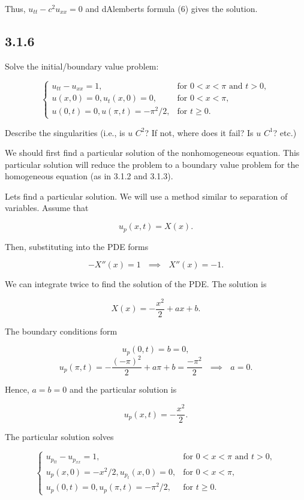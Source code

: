 \documentclass{article}
\begin{document}
Thus, $u_{tt}-c^2u_{xx}=0$ and d\textsc{}Alembert\textsc{}s formula (6) gives the solution.
\subsection{\textbf{3.1.6}} Solve the initial/boundary value problem:

\[
  \begin{cases}
  u_{tt}-u_{xx}=1,  &\text{for $0<x<\pi$ and $t>0$}, \\
  u(x,0)=0, u_t(x,0)=0, & \text{for $0<x<\pi$}, \\
  u(0,t)=0, u(\pi,t)=-\pi^2/2, & \text{for $t\geq0$}.
  \end{cases}
\]

Describe the singularities (i.e., is $u$ $C^2$? If not, where does it fail? Is $u$ $C^1$? etc.)

We should first find a particular solution of the nonhomogeneous equation. This particular solution will reduce the problem to a boundary value problem for the homogeneous equation (as in 3.1.2 and 3.1.3).

Let\textsc{}s find a particular solution. We will use a method similar to separation of variables. Assume that

$$u_p(x,t)=X(x).$$

Then, substituting into the PDE forms

$$-X''(x)=1 ~~~\implies~~~ X''(x)=-1.$$

We can integrate twice to find the solution of the PDE. The solution is

$$X(x)=-\frac{x^2}{2}+ax+b.$$

The boundary conditions form

$$u_p(0,t)=b=0,$$
$$u_p(\pi,t)=-\frac{(-\pi)^2}{2}+a\pi+b=\frac{-\pi^2}{2}~~~\implies~~~ a=0.$$

Hence, $a=b=0$ and the particular solution is

$$u_p(x,t)=-\frac{x^2}{2}.$$

The particular solution solves

\[
  \begin{cases}
  u_{p_{tt}}-u_{p_{xx}}=1,  &\text{for $0<x<\pi$ and $t>0$}, \\
  u_p(x,0)=-{x^2}/{2}, u_{p_t}(x,0)=0, & \text{for $0<x<\pi$}, \\
  u_p(0,t)=0, u_{p}(\pi,t)=-\pi^2/2, & \text{for $t\geq0$}.
  \end{cases}
\]
\end{document}
